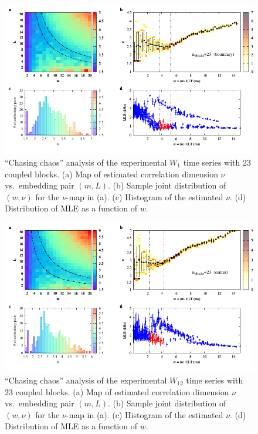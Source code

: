 \begin{appendices}
\begin{figure}[!htbp]
    \centering
    \includegraphics[width=\linewidth]{../blocks/23_blocks/edge/2e5_points/plots/chaos_low.pdf}
    \caption{``Chasing chaos'' analysis of the experimental $W_1$ time series with 23 coupled blocks.
    (a) Map of estimated correlation dimension $\nu$ vs.\ embedding pair $(m, L)$.
    (b) Sample joint distribution of $(w,\nu)$ for the $\nu$-map in (a).
    (c) Histogram of the estimated $\nu$. (d) Distribution of MLE as a function of $w$.
    } 
\end{figure}

\begin{figure}[!htbp]
    \centering
    \includegraphics[width=\linewidth]{../blocks/23_blocks/middle/2e5_points/plots/chaos_low.pdf}
    \caption{``Chasing chaos'' analysis of the experimental $W_{12}$ time series with 23 coupled blocks.
    (a) Map of estimated correlation dimension $\nu$ vs.\ embedding pair $(m, L)$.
    (b) Sample joint distribution of $(w,\nu)$ for the $\nu$-map in (a).
    (c) Histogram of the estimated $\nu$. (d) Distribution of MLE as a function of $w$.
    } 
\end{figure}


\end{appendices}
